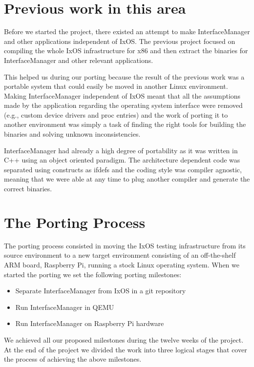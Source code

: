 \section{Previous work in this area}

Before we started the project, there existed an attempt to make InterfaceManager
and other applications independent of IxOS. The previous project focused on
compiling the whole IxOS infrastructure for x86 and then extract the binaries
for InterfaceManager and other relevant applications.

This helped us during our porting because the result of the previous work was a
portable system that could easily be moved in another Linux environment.
Making InterfaceManager independent of IxOS meant that all the assumptions made
by the application regarding the operating system interface were removed (e.g.,
custom device drivers and proc entries) and the work of porting it to another
environment was simply a task of finding the right tools for building the
binaries and solving unknown inconsistencies.

InterfaceManager had already a high degree of portability as it was written
in C++ using an object oriented paradigm. The architecture dependent code was
separated using constructs as ifdefs and the coding style was compiler agnostic,
meaning that we were able at any time to plug another compiler and generate the
correct binaries.

\section{The Porting Process}



The porting process consisted in moving the IxOS testing infrastructure from its
source environment to a new target environment consisting of an off-the-shelf
ARM board, Raspberry Pi, running a stock Linux operating system. When we started
the porting we set the following porting milestones:
\begin{itemize}
    \item Separate InterfaceManager from IxOS in a git repository
    \item Run InterfaceManager in QEMU
    \item Run InterfaceManager on Raspberry Pi hardware
\end{itemize}
We achieved all our proposed milestones during the twelve weeks of the project.
At the end of the project we divided the work into three logical stages
that cover the process of achieving the above milestones.

